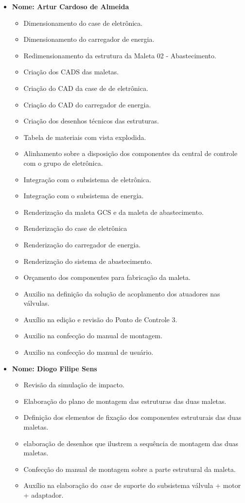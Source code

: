 \begin{itemize}
    
    \item \textbf{Nome: Artur Cardoso de Almeida}
    \begin{itemize}
      \item Dimensionamento do case de eletrônica. 
      \item Dimensionamento do carregador de energia.
      \item Redimensionamento da estrutura da Maleta 02 - Abastecimento.
      \item Criação dos CADS das maletas.
      \item Criação do CAD da case de de eletrônica.
      \item Criação do CAD do carregador de energia.
      \item Criação dos desenhos técnicos das estruturas.
      \item Tabela de materiais com vista explodida.
      \item Alinhamento sobre a disposição dos componentes da central de controle com o grupo de eletrônica. 
      \item Integração com o subsistema de eletrônica.
      \item Integração com o subsistema de energia.
      \item Renderização da maleta GCS e da maleta de abastecimento.
      \item Renderização do case de eletrônica
      \item Renderização do carregador de energia.
      \item Renderização do sistema de abastecimento.
      \item Orçamento dos componentes para fabricação da maleta.
      \item Auxilio na definição da solução de acoplamento dos atuadores nas válvulas.
      \item Auxílio na edição e revisão do Ponto de Controle 3.
      \item Auxilio na confecção do manual de montagem.
      \item Auxilio na confecção do manual de usuário.
    \end{itemize}


    \item \textbf{Nome: Diogo Filipe Sens}
    \begin{itemize}
     \item Revisão da simulação de impacto.
     \item Elaboração do plano de montagem das estruturas das duas maletas.
     \item Definição dos elementos de fixação dos componentes estruturais das duas maletas.
     \item elaboração de desenhos que ilustrem a sequência de montagem das duas maletas.
     \item Confecção do manual de montagem sobre a parte estrutural da maleta.
     \item Auxílio na elaboração do \textit{case} de suporte do subsistema válvula + motor + adaptador.
    \end{itemize}


\end{itemize}

